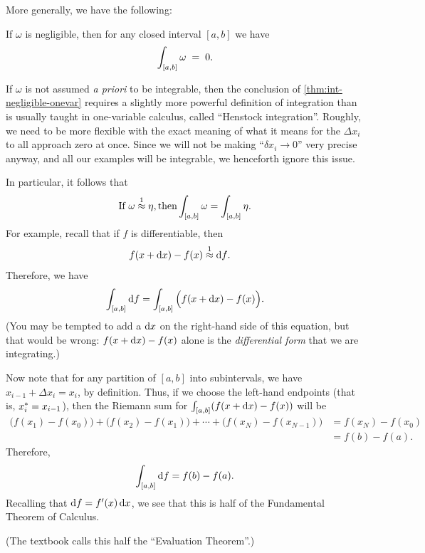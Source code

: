 More generally, we have the following:

\begin{thm}\label{thm:int-negligible-onevar}
  If $\omega$ is negligible, then for any closed interval $[a,b]$ we have
  \[ \int_{[a,b]} \omega \;=\; 0.\]
\end{thm}

\begin{adv}
  If $\omega$ is not assumed \emph{a priori} to be integrable, then the conclusion of \cref{thm:int-negligible-onevar} requires a slightly more powerful definition of integration than is usually taught in one-variable calculus, called ``Henstock integration''.
  Roughly, we need to be more flexible with the exact meaning of what it means for the $\Delta x_i$ to all approach zero at once.
  Since we will not be making ``$\delta x_i\to 0$'' very precise anyway, and all our examples will be integrable, we henceforth ignore this issue.
\end{adv}

In particular, it follows that
\begin{equation}\label{eq:int-apx1-equal}
  \text{If }\omega\mathrel{\overset{1}{\approx}} \eta, \text{then} \displaystyle\int_{[a,b]} \omega = \int_{[a,b]} \eta.
\end{equation}
For example, recall that if $f$ is differentiable, then
\begin{align*}
  f(x+\dx)-f(x) &\apx1 \df. %
\end{align*}
Therefore, we have
\[ \int_{[a,b]} {\mathrm{d} f} = \int_{[a,b]} \Big(f(x+{\mathrm{d} x}) - f(x)\Big). \]
(You may be tempted to add a ${\mathrm{d} x}$ on the right-hand side of this equation, but that would be wrong: $f(x+{\mathrm{d} x}) - f(x)$ alone is the \emph{differential form} that we are integrating.)

Now note that for any partition of $[a,b]$ into subintervals, we have $x_{i-1} + \Delta x_i = x_i$, by definition.
Thus, if we choose the left-hand endpoints (that is, ${x}_{i}^* = x_{i-1}$), then the Riemann sum for $\int_{[a,b]} (f(x+{\mathrm{d} x}) - f(x))$ will be
\begin{align*}
  \Big(f(x_1) - f(x_0)\Big) + \Big(f(x_2)-f(x_1)\Big) + \cdots + \Big(f(x_N) - f(x_{N-1})\Big)
  &= f(x_N) - f(x_0)\\
  &= f(b) - f(a).
\end{align*}
Therefore,
\begin{equation}
  \int_{[a,b]} {\mathrm{d} f} = f(b) - f(a).\label{eq:differential-ftc-eval}
\end{equation}
Recalling that ${\mathrm{d} f} = f'(x)\,{\mathrm{d} x}$, we see that this is half of the Fundamental Theorem of Calculus.
\begin{stewart}(The textbook calls this half the ``Evaluation Theorem''.)\end{stewart}

